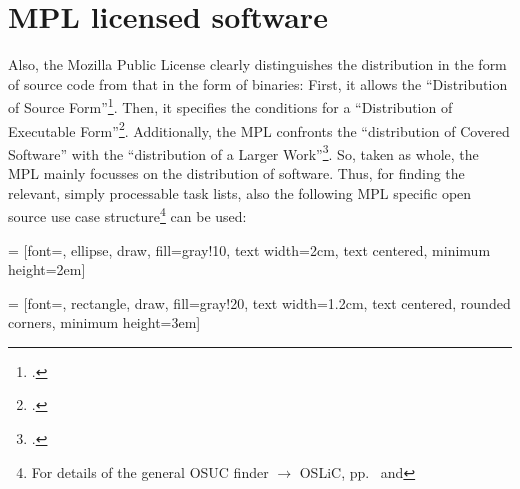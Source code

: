 %
%
%
%
%



\section{MPL licensed software}

Also, the Mozilla Public License clearly distinguishes the distribution in the
form of source code from that in the form of binaries: First, it allows the
\enquote{Distribution of Source Form}\footcite[cf.][\nopage wp.\
§3.1]{Mpl20OsiLicense2013a}. Then, it specifies the conditions for a
\enquote{Distribution of Executable Form}\footcite[cf.][\nopage wp.\
§3.2]{Mpl20OsiLicense2013a}. Additionally, the MPL confronts the
\enquote{distribution of Covered Software} with the \enquote{distribution of a
Larger Work}\footcite[cf.][\nopage wp.\ §3.3]{Mpl20OsiLicense2013a}. So, taken
as whole, the MPL mainly focusses on the distribution of software. Thus, for
finding the relevant, simply processable task lists, also the following MPL
specific open source use case structure\footnote{For details of the general OSUC
finder $\rightarrow$ OSLiC, pp.\ \pageref{OsucTokens} and
\pageref{OsucDefinitionTree}} can be used:
 
 = [font=\small, ellipse, draw, fill=gray!10, 
    text width=2cm, text centered, minimum height=2em]

 = [font=\footnotesize, rectangle, draw, fill=gray!20, 
    text width=1.2cm, text centered, rounded corners, minimum height=3em]

